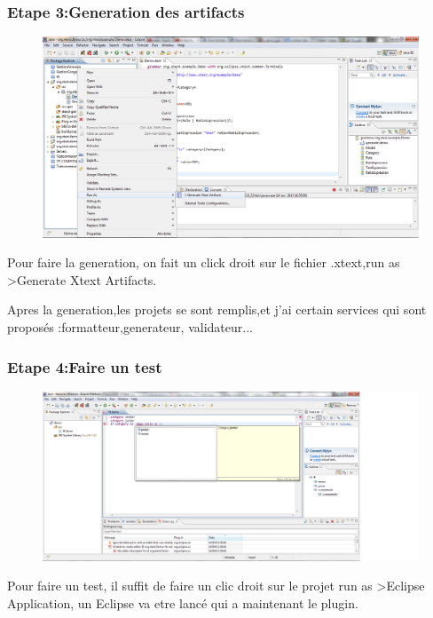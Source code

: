 \documentclass{article}
\begin{document}
 \subsubsection{Etape 3:Generation des artifacts}

\begin{figure}[h]
	\centering
		\includegraphics[width=1.10\textwidth]{3.PNG}
	\label{fig:3}
\end{figure}\FloatBarrier

Pour faire la generation, on fait un click droit sur le fichier .xtext,run as >Generate Xtext Artifacts.

Apres la generation,les projets se sont remplis,et j'ai certain services qui sont proposés :formatteur,generateur, validateur...


 \subsubsection{Etape 4:Faire un test}

\begin{figure}[h]
	\centering
		\includegraphics[width=1.10\textwidth]{4.png}
	\label{fig:4}
\end{figure}\FloatBarrier


Pour faire un test, il suffit de faire un clic droit sur le projet run as >Eclipse Application, un Eclipse va etre lancé qui a maintenant le plugin.
\end{document}
